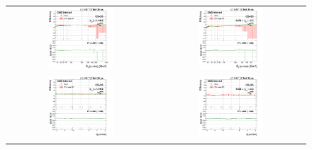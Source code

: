 \begin{figure}[bh]
  \begin{center}
    \begin{tabular}{cc}
      \includegraphics[width=0.45\textwidth]{figures/Zprime/2017/ScaleFactor/SameSign/N-1/g_compare_cut_Et_Barrel_ea_ta_inc_AS_N_1_DEtaIn_PUW.png} &
      \includegraphics[width=0.45\textwidth]{figures/Zprime/2017/ScaleFactor/SameSign/N-1/g_compare_cut_Et_Endcap_ea_ta_inc_AS_N_1_DEtaIn_PUW.png} \\
      \includegraphics[width=0.45\textwidth]{figures/Zprime/2017/ScaleFactor/SameSign/N-1/g_compare_cut_phi_Barrel_ea_ta_inc_AS_N_1_DEtaIn_PUW.png} &
      \includegraphics[width=0.45\textwidth]{figures/Zprime/2017/ScaleFactor/SameSign/N-1/g_compare_cut_phi_Endcap_ea_ta_inc_AS_N_1_DEtaIn_PUW.png} \\

\end{tabular}
\end{center}
\end{figure}
